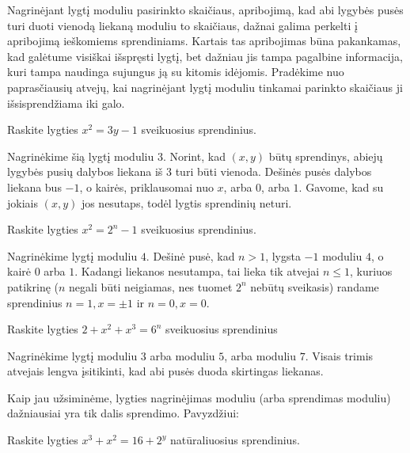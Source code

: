Nagrinėjant lygtį moduliu pasirinkto skaičiaus, apribojimą, kad abi lygybės
pusės turi duoti vienodą liekaną moduliu to skaičiaus, dažnai galima
perkelti į apribojimą ieškomiems sprendiniams. Kartais tas apribojimas būna
pakankamas, kad galėtume visiškai išspręsti lygtį, bet dažniau jis tampa
pagalbine informacija, kuri tampa naudinga sujungus ją su kitomis idėjomis.
Pradėkime nuo paprasčiausių atvejų, kai nagrinėjant lygtį moduliu tinkamai
parinkto skaičiaus ji išsisprendžiama iki galo.

\begin{pav} Raskite lygties $x^2 = 3y - 1$ sveikuosius sprendinius.
\end{pav}

\begin{sprendimas}
Nagrinėkime šią lygtį moduliu $3$. Norint, kad $(x,y)$ būtų sprendinys,
abiejų lygybės pusių dalybos liekana iš $3$ turi būti vienoda. Dešinės
pusės dalybos liekana bus $-1$, o kairės, priklausomai nuo $x$, arba
$0$, arba $1$. Gavome, kad su jokiais $(x,y)$ jos nesutaps, todėl lygtis
sprendinių neturi.
\end{sprendimas}

\begin{pav} Raskite lygties $x^2 = 2^n - 1$ sveikuosius sprendinius. 
\end{pav}

\begin{sprendimas}
  Nagrinėkime lygtį moduliu $4$. Dešinė pusė, kad $n>1$, lygsta $-1$ moduliu
  $4$, o kairė $0$ arba $1$. Kadangi liekanos nesutampa, tai lieka tik
  atvejai $n\leq 1$, kuriuos patikrinę ($n$ negali būti neigiamas, nes
  tuomet $2^n$ nebūtų sveikasis) randame sprendinius $n=1, x=\pm 1$ ir
  $n=0, x=0$. 
\end{sprendimas}

\begin{pav} Raskite lygties $2 + x^2 + x^3 = 6^n$ sveikuosius sprendinius
\end{pav}

\begin{sprendimas}
  Nagrinėkime lygtį moduliu $3$ arba moduliu $5$, arba moduliu $7$. Visais
  trimis atvejais lengva įsitikinti, kad abi pusės duoda skirtingas
  liekanas.
\end{sprendimas}

Kaip jau užsiminėme, lygties nagrinėjimas moduliu (arba sprendimas moduliu)
dažniausiai yra tik dalis sprendimo. Pavyzdžiui:

\begin{pav}
   Raskite lygties $x^3 + x^2 =
  16 + 2^y$ natūraliuosius sprendinius.
\end{pav}

